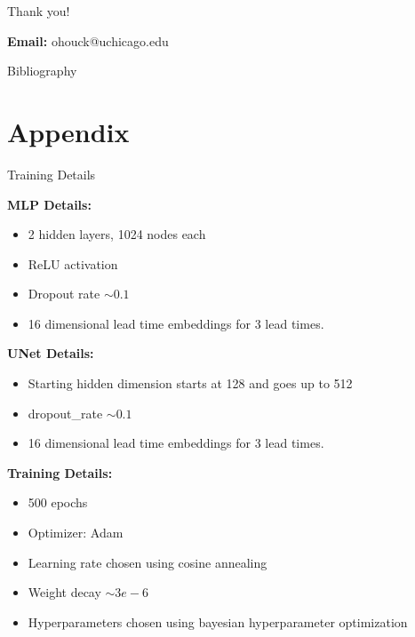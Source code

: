 \documentclass[aspectratio=169, xcolor=dvipsnames]{beamer}
\begin{document}
\begin{frame}{Thank you!}

    \textbf{Email:} ohouck@uchicago.edu

\end{frame}

\begin{frame}{Bibliography}
    \begin{singlespace}
    
    \end{singlespace}
\end{frame}

\section{Appendix}
\begin{frame}[allowframebreaks]{Training Details}
    \hypertarget{TrainingDetails}{} %

    \textbf{MLP Details:}
    \begin{itemize}
        \item 2 hidden layers, 1024 nodes each
        \item ReLU activation
        \item Dropout rate $\sim 0.1$
        \item 16 dimensional lead time embeddings for 3 lead times.
    \end{itemize}

    \textbf{UNet Details:}
    \begin{itemize}
        \item Starting hidden dimension starts at 128 and goes up to 512
        \item dropout\_rate $\sim 0.1$
        \item 16 dimensional lead time embeddings for 3 lead times.
    \end{itemize}

    \textbf{Training Details:}
    \begin{itemize}
        \item 500 epochs
        \item Optimizer: Adam
        \item Learning rate chosen using cosine annealing
        \item Weight decay $\sim 3e-6$
        \item Hyperparameters chosen using bayesian hyperparameter optimization 
    \end{itemize}


\end{frame}
\end{document}
